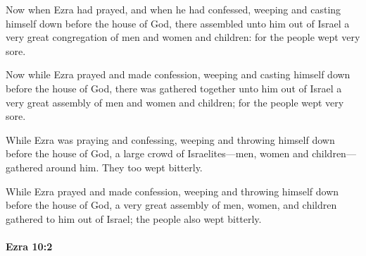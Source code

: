 			Now when Ezra had prayed, and when he had confessed, weeping and casting himself down before the house of God, there assembled unto him out of Israel a very great congregation of men and women and children: for the people wept very sore.

			\begin{versebox}
					\item[BHS] 
					\item[LXX] 
					\item[ASV] Now while Ezra prayed and made confession, weeping and casting himself down before the house of God, there was gathered together unto him out of Israel a very great assembly of men and women and children; for the people wept very sore.
					\item[NIV] While Ezra was praying and confessing, weeping and throwing himself down before the house of God, a large crowd of Israelites—men, women and children—gathered around him. They too wept bitterly.
					\item[NRSV] While Ezra prayed and made confession, weeping and throwing himself down before the house of God, a very great assembly of men, women, and children gathered to him out of Israel; the people also wept bitterly.
			\end{versebox}

		\paragraph{Ezra 10:2} %
			\label{EZRA-10-2}

